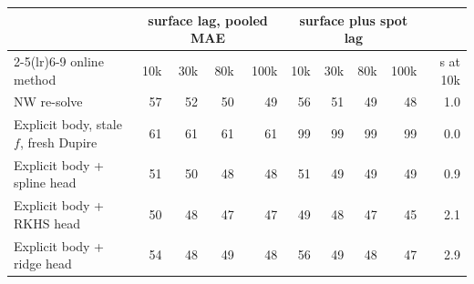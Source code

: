 \begin{tabular}{l rrrr rrrr r}
\toprule
 & \multicolumn{4}{c}{surface lag, pooled MAE} & \multicolumn{4}{c}{surface plus spot lag} & \\
\cmidrule(lr){2-5}\cmidrule(lr){6-9}
online method & 10k & 30k & 80k & 100k & 10k & 30k & 80k & 100k & s at 10k\\
\midrule
NW re-solve & 57 & 52 & 50 & 49 & 56 & 51 & 49 & 48 & 1.0\\
Explicit body, stale $f$, fresh Dupire & 61 & 61 & 61 & 61 & 99 & 99 & 99 & 99 & 0.0\\
Explicit body + spline head & 51 & 50 & 48 & 48 & 51 & 49 & 49 & 49 & 0.9\\
Explicit body + RKHS head & 50 & 48 & 47 & 47 & 49 & 48 & 47 & 45 & 2.1\\
Explicit body + ridge head & 54 & 48 & 49 & 48 & 56 & 49 & 48 & 47 & 2.9\\
\bottomrule
\end{tabular}
